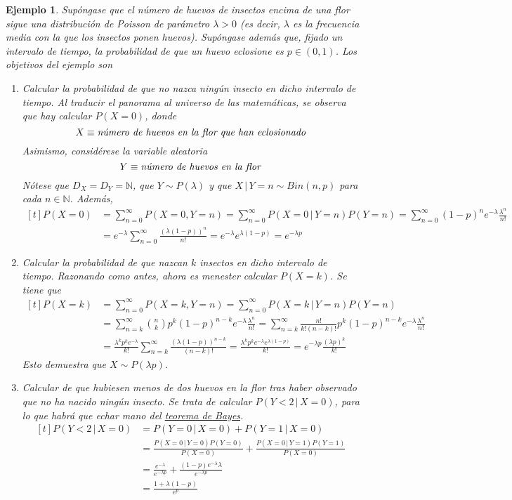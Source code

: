 \documentclass[11pt]{report}
\theoremstyle{mytheorem}
\theoremstyle{mydefinition}
\theoremstyle{myexample}
\newtheorem*{example}{Ejemplo}
\newcommand{\N}{\mathbb N}
\begin{document}
\begin{example}
Supóngase que el número de huevos de insectos encima de una flor sigue una distribución de Poisson de parámetro $\lambda>0$ (es decir, $\lambda$ es la frecuencia media con la que los insectos ponen huevos). Supóngase además que, fijado un intervalo de tiempo, la probabilidad de que un huevo eclosione es $p \in (0,1)$. Los objetivos del ejemplo son
\begin{enumerate}
    \item \textit{Calcular la probabilidad de que no nazca ningún insecto en dicho intervalo de tiempo.} Al traducir el panorama al universo de las matemáticas, se observa que hay calcular $P(X=0)$, donde
    \[X \equiv \textup{\textit{número de huevos en la flor que han eclosionado}}\]
    Asimismo, considérese la variable aleatoria
    \[Y \equiv \textup{\textit{número de huevos en la flor}}\]
    Nótese que $D_X=D_Y=\N$, que $Y \sim P(\lambda)$ y que $X \, | \, Y=n \sim Bin(n,p)$ para cada $n \in   \N$. Además,
    \[
    \begin{aligned}[t]
    P(X=0) &= \sum_{n=0}^\infty P(X=0,Y=n) = \sum_{n=0}^\infty P(X=0 \, | \, Y=n)P(Y=n) = \sum_{n=0}^\infty(1-p)^ne^{-\lambda}\frac{\lambda^n}{n!} \\
    &= e^{-\lambda}\sum_{n=0}^\infty \frac{(\lambda(1-p))^n}{n!} = e^{-\lambda}e^{\lambda(1-p)} = e^{-\lambda p}
    \end{aligned}
    \]
    \item \textit{Calcular la probabilidad de que nazcan $k$ insectos en dicho intervalo de tiempo.} Razonando como antes, ahora es menester calcular $P(X=k)$. Se tiene que
    \[
    \begin{aligned}[t]
    P(X=k) &= \sum_{n=0}^\infty P(X=k,Y=n) = \sum_{n=0}^\infty P(X=k \, | \, Y=n)P(Y=n) \\
    &= \sum_{n=k}^\infty{n \choose k}p^k(1-p)^{n-k} e^{-\lambda}\frac{\lambda^n}{n!}
    = \sum_{n=k}^\infty\frac{n!}{k!(n-k)!}p^k(1-p)^{n-k} e^{-\lambda}\frac{\lambda^n}{n!} \\
    &= \frac{\lambda^kp^ke^{-\lambda}}{k!} \sum_{n=k}^\infty\frac{(\lambda(1-p))^{n-k}}{(n-k)!} = \frac{\lambda^kp^ke^{-\lambda}e^{\lambda(1-p)}}{k!} = e^{-\lambda p}\frac{(\lambda p)^k}{k!}
    \end{aligned}
    \]
    Esto demuestra que $X \sim P(\lambda p)$.
    \item \textit{Calcular de que hubiesen menos de dos huevos en la flor tras haber observado que no ha nacido ningún insecto.} Se trata de calcular $P(Y < 2 \, | \, X=0)$, para lo que habrá que echar mano del \hyperref[teo5.2.]{\color{gray}teorema de Bayes}.
    \[\begin{aligned}[t]
        P(Y < 2 \, | \, X=0) &= P(Y=0 \, | \, X=0)+P(Y=1 \, | \, X=0) \\
        &= \frac{P(X=0 \, | \, Y=0)P(Y=0)}{P(X=0)}+\frac{P(X=0 \, | \, Y=1)P(Y=1)}{P(X=0)} \\
        &= \frac{e^{-\lambda}}{e^{-\lambda p}}+\frac{(1-p)e^{-\lambda} \lambda}{e^{-\lambda p}} \\
        &= \frac{1+\lambda(1-p)}{e^{p}}
    \end{aligned}\]
\end{enumerate}
\end{example}
\end{document}
